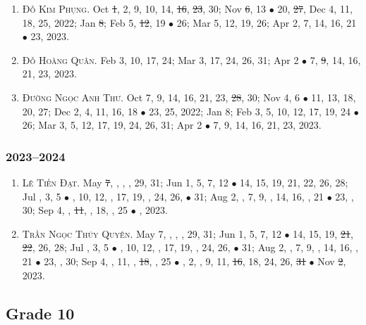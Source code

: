 \documentclass{article}
\begin{document}
\begin{enumerate}
	\item \textsc{Đỗ Kim Phụng.} {\sf[In]} Oct \st{1}, 2, 9, 10, 14, \st{16}, \st{23}, 30; Nov \st{6}, 13 $\bullet$ 20, \st{27}, Dec 4, 11, 18, 25, 2022; Jan \st{8}; Feb 5, \st{12}, 19 $\bullet$ 26; Mar 5, 12, 19, 26; Apr 2, 7, 14, 16, 21 $\bullet$ 23, 2023.
	\item \textsc{Đỗ Hoàng Quân.} {\sf[In]} Feb 3, 10, 17, 24; Mar 3, 17, 24, 26, 31; Apr 2 $\bullet$ 7, \st{9}, 14, 16, 21, 23, 2023.
	\item \textsc{Đường Ngọc Anh Thư.} {\sf[In]} Oct 7, 9, 14, 16, 21, 23, \st{28}, 30; Nov 4, 6 $\bullet$ 11, 13, 18, 20, 27; Dec 2, 4, 11, 16, 18 $\bullet$ 23, 25, 2022; Jan 8; Feb 3, 5, 10, 12, 17, 19, 24 $\bullet$ 26; Mar 3, 5, 12, 17, 19, 24, 26, 31; Apr 2 $\bullet$ 7, 9, 14, 16, 21, 23, 2023.
\end{enumerate}

\subsubsection{2023--2024}

\begin{enumerate}
	\item \textsc{Lê Tiến Đạt.} May \st{7}, , , , 29, 31; Jun 1, 5, 7, 12 $\bullet$ 14, 15, 19, 21, 22, 26, 28; Jul , 3, 5 $\bullet$ , 10, 12, , 17, 19, , 24, 26,  $\bullet$ 31; Aug 2, , 7, 9, , 14, 16, , 21 $\bullet$ 23, , 30; Sep 4, , \st{11}, , 18, , 25 $\bullet$ , 2023. {\sf[Out]}
	\item \textsc{Trần Ngọc Thúy Quyên.} May 7, , , , 29, 31; Jun 1, 5, 7, 12 $\bullet$ 14, 15, 19, \st{21}, \st{22}, 26, 28; Jul , 3, 5 $\bullet$ , 10, 12, , 17, 19, , 24, 26,  $\bullet$ 31; Aug 2, , 7, 9, , 14, 16, , 21 $\bullet$ 23, , 30; Sep 4, , 11, , \st{18}, , 25 $\bullet$ , 2, , 9, 11, \st{16}, 18, 24, 26, \st{31} $\bullet$ Nov \st{2}, 2023.
\end{enumerate}


\subsection{Grade 10}
\end{document}
